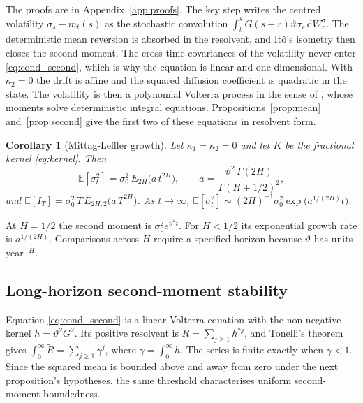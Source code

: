 \documentclass[11pt,a4paper]{article}
\newtheorem{corollary}[theorem]{Corollary}
\theoremstyle{definition}
\newcommand{\D}{\mathrm{d}}
\newcommand{\E}{\mathbb{E}}
\begin{document}
The proofs are in Appendix~\ref{app:proofs}. The key step writes the centred volatility $\sigma_s-m_t(s)$ as the stochastic convolution $\int_t^sG(s-r)\vartheta\sigma_r\,\D W^\sigma_r$. The deterministic mean reversion is absorbed in the resolvent, and It\^o's isometry then closes the second moment. The cross-time covariances of the volatility never enter \eqref{eq:cond_second}, which is why the equation is linear and one-dimensional.
With $\kappa_2=0$ the drift is affine and the squared diffusion coefficient is quadratic in the state. The volatility is then a polynomial Volterra process in the sense of \citet{AbiJaberCuchieroPelizzariPulidoSvalutoFerro2024}, whose moments solve deterministic integral equations. Propositions~\ref{prop:mean} and~\ref{prop:second} give the first two of these equations in resolvent form.

\begin{corollary}[Mittag-Leffler growth]\label{cor:ml}
Let $\kappa_1=\kappa_2=0$ and let $K$ be the fractional kernel \eqref{eq:kernel}. Then
\begin{equation}\label{eq:ml_second}
\E[\sigma_t^2]=\sigma_0^2\,E_{2H}\big(a\,t^{2H}\big),\qquad a=\frac{\vartheta^2\,\Gamma(2H)}{\Gamma(H+1/2)^2},
\end{equation}
and $\E[I_T]=\sigma_0^2\,T\,E_{2H,2}\big(a\,T^{2H}\big)$. As $t\to\infty$, $\E[\sigma_t^2]\sim(2H)^{-1}\sigma_0^2\exp\big(a^{1/(2H)}t\big)$.
\end{corollary}

At $H=1/2$ the second moment is $\sigma_0^2e^{\vartheta^2t}$. For $H<1/2$ its exponential growth rate is $a^{1/(2H)}$. Comparisons across $H$ require a specified horizon because $\vartheta$ has units year$^{-H}$.
\subsection{Long-horizon second-moment stability}\label{sec:stability}

Equation \eqref{eq:cond_second} is a linear Volterra equation with the non-negative kernel $h=\vartheta^2G^2$. Its positive resolvent is $\widetilde R=\sum_{j\ge1}h^{*j}$, and Tonelli's theorem gives $\int_0^\infty\widetilde R=\sum_{j\ge1}\gamma^j$, where $\gamma=\int_0^\infty h$. The series is finite exactly when $\gamma<1$. Since the squared mean is bounded above and away from zero under the next proposition's hypotheses, the same threshold characterises uniform second-moment boundedness.
\end{document}
